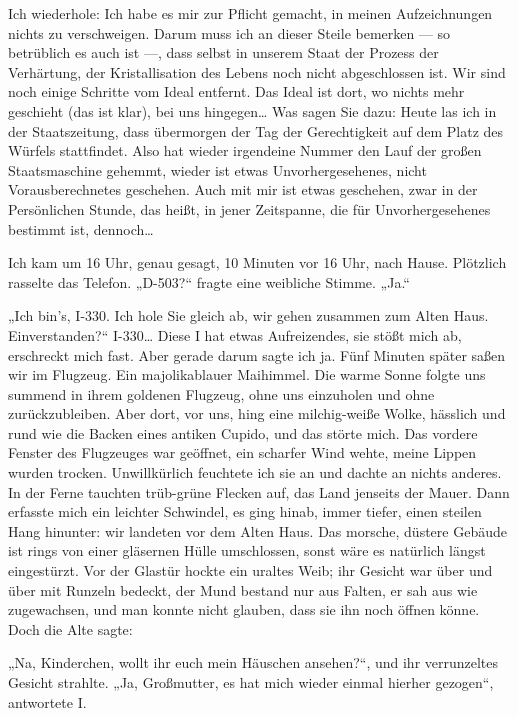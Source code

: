 Ich wiederhole: Ich habe es mir zur Pflicht gemacht, in meinen
Aufzeichnungen nichts zu verschweigen. Darum muss ich an dieser
Steile bemerken — so betrüblich es auch ist —, dass selbst in
unserem Staat der Prozess der Verhärtung, der Kristallisation des
Lebens noch nicht abgeschlossen ist. Wir sind noch einige Schritte
vom Ideal entfernt. Das Ideal ist dort, wo nichts mehr geschieht
(das ist klar), bei uns hingegen\ldots{} Was sagen Sie dazu: Heute las
ich in der Staatszeitung, dass übermorgen der Tag der Gerechtigkeit
auf dem Platz des Würfels stattfindet. Also hat wieder irgendeine
Nummer den Lauf der großen Staatsmaschine gehemmt, wieder ist etwas
Unvorhergesehenes, nicht Vorausberechnetes geschehen. Auch mit mir
ist etwas geschehen, zwar in der Persönlichen Stunde, das heißt, in
jener Zeitspanne, die für Unvorhergesehenes bestimmt ist,
dennoch\ldots{}

Ich kam um 16 Uhr, genau gesagt, 10 Minuten vor 16 Uhr, nach Hause.
Plötzlich rasselte das Telefon. „D-503?“ fragte eine weibliche
Stimme. „Ja.“

„Ich bin's, I-330. Ich hole Sie gleich ab, wir gehen zusammen zum
Alten Haus. Einverstanden?“ I-330\ldots{} Diese I hat etwas
Aufreizendes, sie stößt mich ab, erschreckt mich fast. Aber gerade
darum sagte ich ja. Fünf Minuten später saßen wir im Flugzeug. Ein
majolikablauer Maihimmel. Die warme Sonne folgte uns summend in
ihrem goldenen Flugzeug, ohne uns einzuholen und ohne
zurückzubleiben. Aber dort, vor uns, hing eine milchig-weiße Wolke,
hässlich und rund wie die Backen eines antiken Cupido, und das
störte mich. Das vordere Fenster des Flugzeuges war geöffnet, ein
scharfer Wind wehte, meine Lippen wurden trocken. Unwillkürlich
feuchtete ich sie an und dachte an nichts anderes. In der Ferne
tauchten trüb-grüne Flecken auf, das Land jenseits der Mauer. Dann
erfasste mich ein leichter Schwindel, es ging hinab, immer tiefer,
einen steilen Hang hinunter: wir landeten vor dem Alten Haus. Das
morsche, düstere Gebäude ist rings von einer gläsernen Hülle
umschlossen, sonst wäre es natürlich längst eingestürzt. Vor der
Glastür hockte ein uraltes Weib; ihr Gesicht war über und über mit
Runzeln bedeckt, der Mund bestand nur aus Falten, er sah aus wie
zugewachsen, und man konnte nicht glauben, dass sie ihn noch öffnen
könne. Doch die Alte sagte:

„Na, Kinderchen, wollt ihr euch mein Häuschen ansehen?“, und ihr
verrunzeltes Gesicht strahlte. „Ja, Großmutter, es hat mich wieder
einmal hierher gezogen“, antwortete I.

